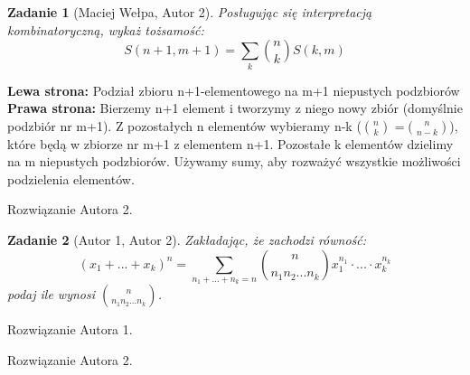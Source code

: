 \documentclass{mwart}
\newtheorem{zad}{Zadanie}[section]
\begin{document}
\begin{zad}[Maciej Wełpa, Autor 2]
    Posługując się interpretacją kombinatoryczną, wykaż tożsamość:
    \[S(n+1,m+1) = \sum_k \binom{n}{k}S(k,m)\]
\end{zad}
\begin{mdframed}
    \textbf{Lewa strona:} Podział zbioru n+1-elementowego na m+1 niepustych podzbiorów\\
    \textbf{Prawa strona:} Bierzemy n+1 element i tworzymy z niego nowy zbiór (domyślnie podzbiór nr m+1). Z pozostałych
    n elementów wybieramy n-k (\(\binom{n}{k}\) =\(\binom{n}{n-k}\)), które będą w zbiorze nr m+1 z elementem n+1. Pozostałe k elementów dzielimy na m niepustych podzbiorów. Używamy sumy, aby rozważyć wszystkie możliwości podzielenia elementów.
\end{mdframed}
\begin{mdframed}
    Rozwiązanie Autora 2.
\end{mdframed}




\begin{zad}[Autor 1, Autor 2]
    Zakładając, że zachodzi równość:
    \[
        (x_1 + ... + x_k)^n = \sum_{n_1+...+n_k=n}\binom{n}{n_1 n_2 ... n_k}x_1^{n_1}\cdot...\cdot x_k^{n_k}
    \]
    podaj ile wynosi $\binom{n}{n_1 n_2 ... n_k}$.
\end{zad}
\begin{mdframed}
    Rozwiązanie Autora 1.
\end{mdframed}
\begin{mdframed}
    Rozwiązanie Autora 2.
\end{mdframed}
\end{document}
